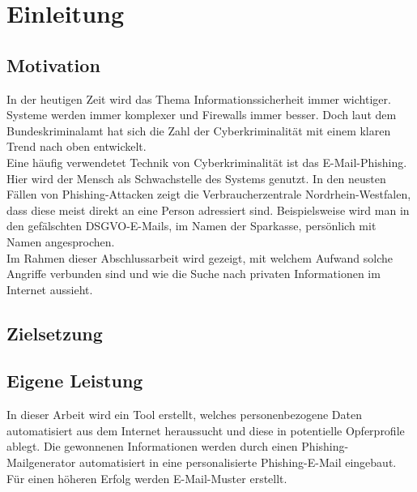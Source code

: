 \chapter{Einleitung}
\label{cha:einleitung}


\section{Motivation}
\label {sec:Motivation}
In der heutigen Zeit wird das Thema Informationssicherheit immer wichtiger. Systeme werden immer komplexer und Firewalls immer besser.
Doch laut dem Bundeskriminalamt hat sich die Zahl der Cyberkriminalität mit einem klaren Trend nach oben entwickelt. \cite{Cyberkriminalitaet}\\
Eine häufig verwendetet Technik von Cyberkriminalität ist das E-Mail-Phishing. Hier wird der Mensch als Schwachstelle des Systems genutzt. In den neusten Fällen von Phishing-Attacken zeigt die Verbraucherzentrale Nordrhein-Westfalen, dass diese meist direkt an eine Person adressiert sind. Beispielsweise wird man in den gefälschten DSGVO-E-Mails, im Namen der Sparkasse, persönlich mit Namen angesprochen. \cite{VerbraucherzentraleNW} \\
Im Rahmen dieser Abschlussarbeit wird gezeigt, mit welchem Aufwand solche Angriffe verbunden sind und wie die Suche nach privaten Informationen im Internet aussieht.

\section{Zielsetzung}
\label {sec:Zielsetzung}
 
\section{Eigene Leistung}
\label {sec:Eigene Leistung} 
In dieser Arbeit wird ein Tool erstellt, welches personenbezogene Daten automatisiert aus dem Internet heraussucht und diese in potentielle Opferprofile ablegt. Die gewonnenen Informationen werden durch einen Phishing-Mailgenerator automatisiert in eine personalisierte Phishing-E-Mail eingebaut. Für einen höheren Erfolg werden E-Mail-Muster erstellt.

